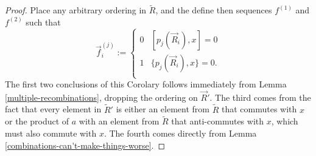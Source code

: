 \documentclass[twocolumn,showpacs,preprintnumbers,amsmath,amssymb,nofootinbib,pra,floatfix]{revtex4-1}
\newcommand{\lst}{\vec}
\newcommand{\set}{\tilde}
\begin{document}
\begin{proof}
Place any arbitrary ordering in $\set R$, and the define then sequences $f^{(1)}$ and $f^{(2)}$ such that
$$\lst f^{(j)}_i :=
\begin{cases}
0 & [p_j(\lst R_i),x] = 0 \\
1 & \{p_j(\lst R_i),x\} = 0. \\
\end{cases}
$$
The first two conclusions of this Corolary follows immediately from Lemma \ref{multiple-recombinations}, dropping the ordering on $\lst R'$.  The third comes from the fact that every element in $\set R'$ is either an element from $\set R$ that commutes with $x$ or the product of $a$ with an element from $\set R$ that anti-commutes with $x$, which must also commute with $x$.  The fourth comes directly from Lemma \ref{combinations-can't-make-things-worse}.
\end{proof}
\end{document}
